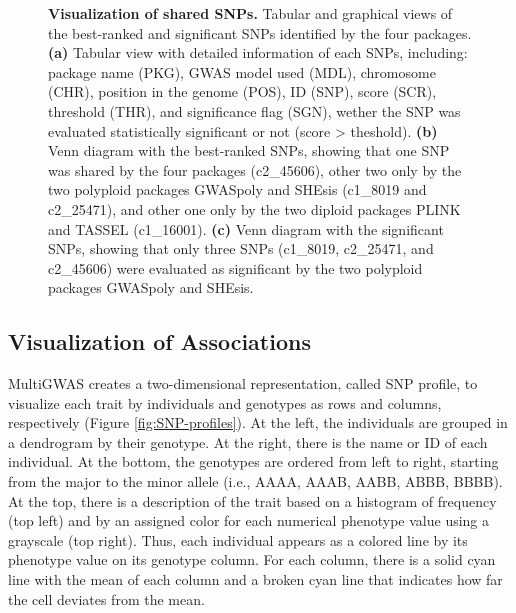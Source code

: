\documentclass{article}
\begin{document}
\begin{figure}[H]
\caption{\scriptsize \textbf{Visualization of shared SNPs.} Tabular and graphical views of the best-ranked and significant SNPs identified by the four packages. \textbf{(a)} Tabular view with detailed information of each SNPs, including: package name (PKG), GWAS model used (MDL), chromosome (CHR), position in the genome (POS), ID (SNP), score (SCR), threshold (THR), and significance flag (SGN), wether the SNP was evaluated statistically significant or not (score > theshold). \textbf{(b)} Venn diagram with the best-ranked SNPs, showing that one SNP was shared by the four packages (c2\_45606), other two only by the two polyploid packages GWASpoly and SHEsis (c1\_8019 and c2\_25471), and other one only by the two diploid packages PLINK and TASSEL (c1\_16001). \textbf{(c)} Venn diagram with the significant SNPs, showing that only three SNPs (c1\_8019, c2\_25471, and c2\_45606) were evaluated as significant by the two polyploid packages GWASpoly and SHEsis.\label{fig:-View-Shared-SNPs}}
\end{figure}

\subsection{Visualization of Associations }
MultiGWAS creates a two-dimensional representation, called SNP profile, to visualize each trait by individuals and genotypes as rows and columns, respectively (Figure \ref{fig:SNP-profiles}). At the left, the individuals are grouped in a dendrogram by their genotype. At the right, there is the name or ID of each individual. At the bottom, the genotypes are ordered from left to right, starting from the major to the minor allele (i.e., AAAA, AAAB, AABB, ABBB, BBBB). At the top, there is a description of the trait based on a histogram of frequency (top left) and by an assigned color for each numerical phenotype value using a grayscale (top right). Thus, each individual appears as a colored line by its phenotype value on its genotype column. For each column, there is a solid cyan line with the mean of each column and a broken cyan line that indicates how far the cell deviates from the mean.
\end{document}
